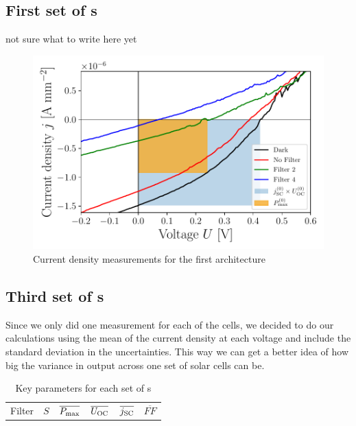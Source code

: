 \documentclass[a4paper,10pt,twocolumn]{article}
\begin{document}
\begin{extract*}
\subsection{First set of \BHSC s}

not sure what to write here yet

\begin{figure}[h]\centering
	\includegraphics[width=\columnwidth]{../../../IV-Curve-Analysis/OSC1Graph.pdf}
	\caption{Current density measurements for the first architecture}
	\label{fig:OSC1Graph}
\end{figure}

\subsection{Third set of \BHSC s}

Since we only did one measurement for each of the cells, we decided to do our calculations using the mean of the current density at each voltage and include the standard deviation in the uncertainties. This way we can get a better idea of how big the variance in output across one set of solar cells can be.

\begin{table}[h]\centering
	\caption{Key parameters for each set of \BHSC s}
	\label{tab:keyparams}
	\begin{tabular}{@{}cccccc@{}}\toprule
		Filter & $S$ & $\overline{P_{\text{max}}}$ & $\overline{U_{\text{OC}}}$ & $\overline{j_{\text{SC}}}$ &$\overline{FF}$
	\end{tabular}
\end{table}

\end{extract*}
\end{document}
